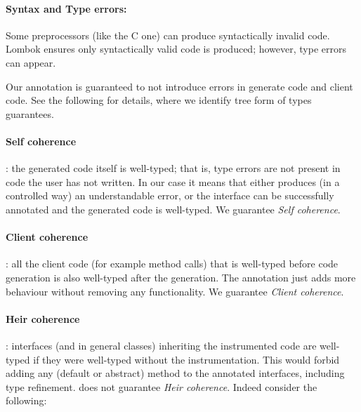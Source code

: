 


\paragraph{Syntax and Type errors:}
Some preprocessors (like the C one) can produce syntactically invalid code.
Lombok ensures only syntactically valid code is produced; however, type errors can appear.

Our annotation is guaranteed to not introduce errors in generate code and client code.
See the following for details, where we identify tree form of types guarantees.


\paragraph{Self coherence}: the generated code itself is well-typed; that is,
  type errors are not present in code the user has not written.
In our case it means that either \mixin{} produces (in a controlled way) an
understandable error, or the interface can be successfully annotated and the generated code is well-typed.
We guarantee \textit{Self coherence}.

\paragraph{Client coherence}: all the client code (for example method calls)
  that is well-typed before code generation is also well-typed after the generation.
The annotation just adds more behaviour without removing any functionality.
We guarantee \textit{Client coherence}.

\paragraph{Heir coherence}: interfaces (and in general classes) inheriting the instrumented code are well-typed if they were well-typed without the instrumentation.
This would forbid adding any (default or abstract) method to the annotated interfaces, including type refinement.
\mixin  does not guarantee \textit{Heir coherence}.
Indeed consider the following:


